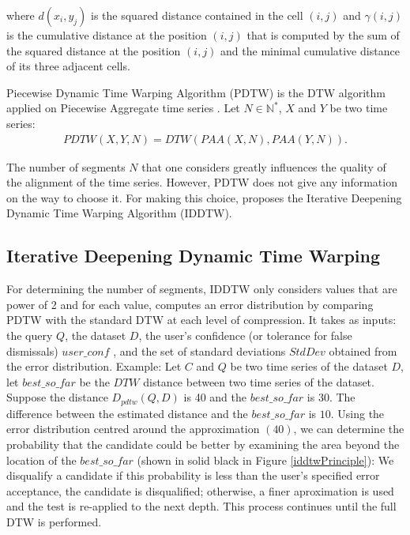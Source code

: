 where $d(x_{i},y_{j})$ is the squared distance contained in the cell $(i, j)$ and $\gamma(i, j)$ is the cumulative distance at the position $(i, j)$ that is computed by the sum of the squared distance at the position $(i, j)$ and the minimal cumulative distance of its three adjacent cells.


Piecewise Dynamic Time Warping Algorithm (PDTW) \cite{keogh2000scaling} is the DTW algorithm applied on Piecewise Aggregate time series \cite{keogh2001dimensionality}. Let $N\in\mathbb{N^{*}}$, $X$ and $Y$ be two time series:
\begin{eqnarray}
PDTW(X, Y, N) = DTW(PAA(X, N), PAA(Y, N)).
\end{eqnarray}

The number  of segments $N$ that one considers greatly influences the quality of the alignment of the time series. However, PDTW does not give any information on the way to choose it. For making this choice, \cite{chu2002iterative} proposes the Iterative Deepening Dynamic Time Warping Algorithm (IDDTW).



\subsection{Iterative Deepening Dynamic Time Warping}
\label{sec:2}

For determining the number of segments, IDDTW only considers values that are  power of 2 and for each value, computes an error distribution by comparing PDTW with the standard DTW at each level of compression. It takes as inputs: the query $Q$, the dataset $D$, the user's confidence (or tolerance for false dismissals) $user\_conf$ , and the set of standard deviations $StdDev$ obtained from the error distribution. Example: Let $C$ and $Q$ be two time series of the dataset $D$, let $best\_so\_far$ be the $DTW$ distance between two time series of the dataset. Suppose the distance $D_{pdtw}(Q, D)$ is 40 and the $best\_so\_far$ is $30$. The difference between the estimated distance and the $best\_so\_far$ is $10$. Using the error distribution centred around the approximation $(40)$, we can determine the probability that the candidate could be better by examining the area beyond the location of the $best\_so\_far$ (shown in solid black in
Figure \ref{iddtwPrinciple}): We disqualify a candidate if this probability is less than the user's specified error acceptance, the candidate is disqualified; otherwise, a finer aproximation is used and the test is re-applied to the next depth. This process continues until the full DTW is performed.


